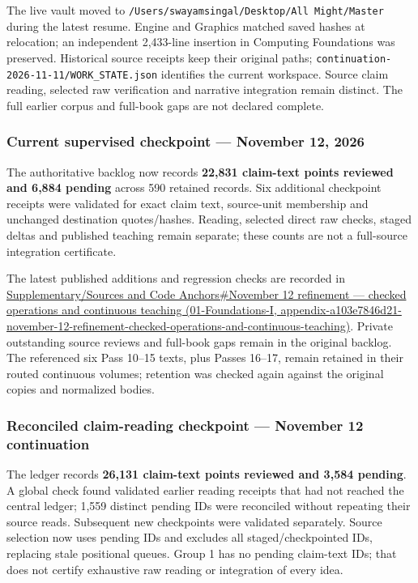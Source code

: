The live vault moved to \texttt{/Users/swayamsingal/Desktop/All\ Might/Master} during the latest resume. Engine and Graphics matched saved hashes at relocation; an independent 2,433-line insertion in Computing Foundations was preserved. Historical source receipts keep their original paths; \texttt{continuation-2026-11-11/WORK\_STATE.json} identifies the current workspace. Source claim reading, selected raw verification and narrative integration remain distinct. The full earlier corpus and full-book gaps are not declared complete.

\subsubsection{Current supervised checkpoint --- November 12, 2026}\label{appendix-3b67654799a2-current-supervised-checkpoint-november-12-2026}

The authoritative backlog now records \textbf{22,831 claim-text points reviewed and 6,884 pending} across 590 retained records. Six additional checkpoint receipts were validated for exact claim text, source-unit membership and unchanged destination quotes/hashes. Reading, selected direct raw checks, staged deltas and published teaching remain separate; these counts are not a full-source integration certificate.

The latest published additions and regression checks are recorded in \href{../01-Foundations-I/main.pdf\#nameddest=appendix-a103e7846d21-november-12-refinement-checked-operations-and-continuous-teaching}{Supplementary/Sources and Code Anchors\#November 12 refinement --- checked operations and continuous teaching (01-Foundations-I, appendix-a103e7846d21-november-12-refinement-checked-operations-and-continuous-teaching)}. Private outstanding source reviews and full-book gaps remain in the original backlog. The referenced six Pass 10--15 texts, plus Passes 16--17, remain retained in their routed continuous volumes; retention was checked again against the original copies and normalized bodies.

\subsubsection{Reconciled claim-reading checkpoint --- November 12 continuation}\label{appendix-3b67654799a2-reconciled-claim-reading-checkpoint-november-12-continuation}

The ledger records \textbf{26,131 claim-text points reviewed and 3,584 pending}. A global check found validated earlier reading receipts that had not reached the central ledger; 1,559 distinct pending IDs were reconciled without repeating their source reads. Subsequent new checkpoints were validated separately. Source selection now uses pending IDs and excludes all staged/checkpointed IDs, replacing stale positional queues. Group 1 has no pending claim-text IDs; that does not certify exhaustive raw reading or integration of every idea.


